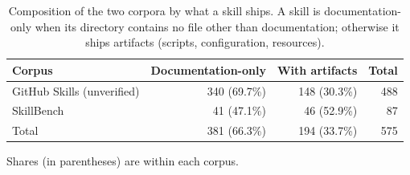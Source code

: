 \begin{table}[t]
  \centering
  \caption{Composition of the two corpora by what a skill ships. A skill is documentation-only when its directory contains no file other than documentation; otherwise it ships artifacts (scripts, configuration, resources).}
  \label{tab:rq1-composition}
  \small
  \setlength{\tabcolsep}{5pt}
  \begin{tabular}{l r r r}
    \toprule
    Corpus & Documentation-only & With artifacts & Total \\
    \midrule
    GitHub Skills (unverified) & 340 (69.7\%) & 148 (30.3\%) & 488 \\
    SkillBench & 41 (47.1\%) & 46 (52.9\%) & 87 \\
    \midrule
    Total & 381 (66.3\%) & 194 (33.7\%) & 575 \\
    \bottomrule
  \end{tabular}

  \vspace{2pt}
  \begin{minipage}{\linewidth}
    \footnotesize\raggedright Shares (in parentheses) are within each corpus.
  \end{minipage}
\end{table}
